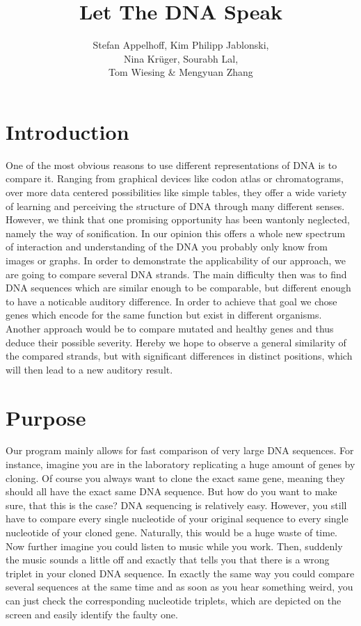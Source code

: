 \documentclass[10pt]{article}
\title{Let The DNA Speak}
\author{Stefan Appelhoff, Kim Philipp Jablonski, \\Nina Krüger, Sourabh Lal, \\Tom Wiesing \& Mengyuan Zhang}
\begin{document}
\maketitle

\tableofcontents

\section{Introduction}

One of the most obvious reasons to use different representations of DNA is to compare it. Ranging from graphical devices like codon atlas or chromatograms, over more data centered possibilities like simple tables, they offer a wide variety of learning and perceiving the structure of DNA through many different senses.
However, we think that one promising opportunity has been wantonly neglected, namely the way of sonification. In our opinion this offers a whole new spectrum of interaction and understanding of the DNA you probably only know from images or graphs.
In order to demonstrate the applicability of our approach, we are going to compare several DNA strands. The main difficulty then was to find DNA sequences which are similar enough to be comparable, but different enough to have a noticable auditory difference.
In order to achieve that goal we chose genes which encode for the same function but exist in different organisms. Another approach would be to compare mutated and healthy genes and thus deduce their possible severity. Hereby we hope to observe a general similarity of the compared strands, but with significant differences in distinct positions, which will then lead to a new auditory result.

\section{Purpose}

Our program mainly allows for fast comparison of very large DNA sequences. For instance, imagine you are in the laboratory replicating a huge amount of genes by cloning. Of course you always want to clone the exact same gene, meaning they should all have the exact same DNA sequence. But how do you want to make sure, that this is the case?
DNA sequencing is relatively easy. However, you still have to compare every single nucleotide of your original sequence to every single nucleotide of your cloned gene. Naturally, this would be a huge waste of time.
Now further imagine you could listen to music while you work. Then, suddenly the music sounds a little off and exactly that tells you that there is a wrong triplet in your cloned DNA sequence. In exactly the same way you could compare several sequences at the same time and as soon as you hear something weird, you can just check the corresponding nucleotide triplets, which are depicted on the screen and easily identify the faulty one. 
\end{document}
